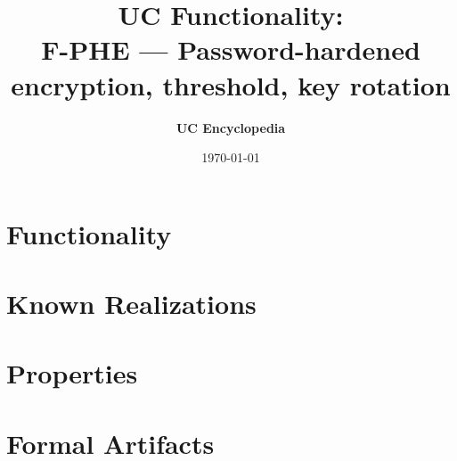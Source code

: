 \documentclass[11pt,a4paper]{article}
\title{\textbf{\Large UC Functionality:}\\[0.2em] \Large F-PHE --- Password-hardened encryption, threshold, key rotation}
\author{\textbf{UC Encyclopedia}}
\date{\today}
\newtheorem{functionality}{Functionality}
\begin{document}
\maketitle

\begin{abstract}
\end{abstract}

\section{Functionality}

%

\section{Known Realizations}


\section{Properties}


\section{Formal Artifacts}

\end{document}
